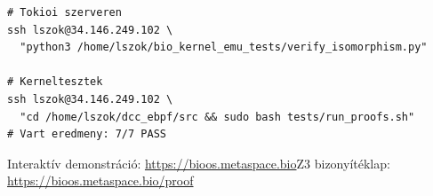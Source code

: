 \documentclass[11pt,a4paper,twoside]{article}
\newcommand{\bioURL}{\url{https://bioos.metaspace.bio}}
\newcommand{\proofURL}{\url{https://bioos.metaspace.bio/proof}}
\begin{document}
\begin{magyar}
\begin{lstlisting}[style=shellstyle]
# Tokioi szerveren
ssh lszok@34.146.249.102 \
  "python3 /home/lszok/bio_kernel_emu_tests/verify_isomorphism.py"

# Kerneltesztek
ssh lszok@34.146.249.102 \
  "cd /home/lszok/dcc_ebpf/src && sudo bash tests/run_proofs.sh"
# Vart eredmeny: 7/7 PASS
\end{lstlisting}

Interaktív demonstráció: \bioURL \quad Z3 bizonyítéklap: \proofURL

\end{magyar}
\end{document}

